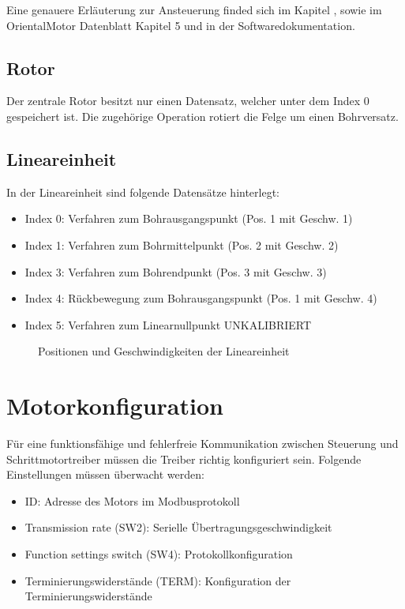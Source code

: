 \documentclass[letterpaper,10pt,english]{sphinxmanual}
\begin{document}
Eine genauere Erläuterung zur Ansteuerung finded sich im Kapitel {\hyperref[_xfcberblick:modbus\string-rs\string-485]{}},
sowie im OrientalMotor Datenblatt Kapitel 5 und in der Softwaredokumentation.


\subsection{Rotor}
\label{_xfcberblick:rotor}
Der zentrale Rotor besitzt nur einen Datensatz, welcher unter dem Index 0 gespeichert ist. Die
zugehörige Operation rotiert die Felge um einen Bohrversatz.


\subsection{Lineareinheit}
\label{_xfcberblick:lineareinheit}
In der Lineareinheit sind folgende Datensätze hinterlegt:
\begin{itemize}
\item {} 
Index 0: Verfahren zum Bohrausgangspunkt (Pos. 1 mit Geschw. 1)

\item {} 
Index 1: Verfahren zum Bohrmittelpunkt (Pos. 2 mit Geschw. 2)

\item {} 
Index 3: Verfahren zum Bohrendpunkt (Pos. 3 mit Geschw. 3)

\item {} 
Index 4: Rückbewegung zum Bohrausgangspunkt (Pos. 1 mit Geschw. 4)

\item {} 
Index 5: Verfahren zum Linearnullpunkt UNKALIBRIERT

\end{itemize}
\begin{figure}[htbp]
\centering
\capstart

\noindent{}
\caption{Positionen und Geschwindigkeiten der Lineareinheit}\label{_xfcberblick:id3}\end{figure}


\section{Motorkonfiguration}
\label{_xfcberblick:motorkonfiguration}
Für eine funktionsfähige und fehlerfreie Kommunikation zwischen Steuerung und Schrittmotortreiber
müssen die Treiber richtig konfiguriert sein. Folgende Einstellungen müssen überwacht werden:
\begin{itemize}
\item {} 
ID: Adresse des Motors im Modbusprotokoll

\item {} 
Transmission rate (SW2): Serielle Übertragungsgeschwindigkeit

\item {} 
Function settings switch (SW4): Protokollkonfiguration

\item {} 
Terminierungswiderstände (TERM): Konfiguration der Terminierungswiderstände

\end{itemize}
\end{document}
